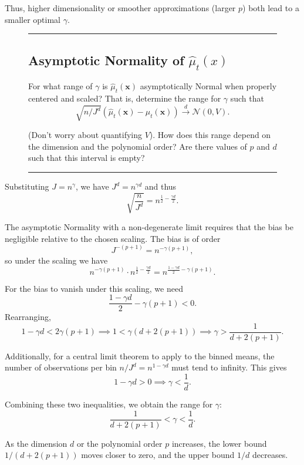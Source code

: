 \documentclass{article}
\newenvironment{colorparagraph}[1]{\par\color{#1}}{\par}
\begin{document}
Thus, higher dimensionality or smoother approximations (larger \( p \)) both lead to a smaller optimal \(\gamma\).
  
\begin{figure}[H]
  \begin{colorparagraph}{questioncolor}
  \rule{\textwidth}{0.5pt}
  \label{q1e}
  \subsection{Asymptotic Normality of \(\hat{\mu}_t(x)\)}
  
  For what range of \( \gamma \) is \( \hat{\mu}_t(\mathbf{x}) \) asymptotically Normal when properly centered and scaled? That is, determine the range for \( \gamma \) such that
  \[
  \sqrt{n / J^d} (\hat{\mu}_t(\mathbf{x}) - \mu_t(\mathbf{x})) \overset{d}{\to} \mathcal{N}(0, V).
  \]
  
  
  (Don't worry about quantifying $V$). How does this range depend on the dimension and the polynomial order? Are there values of $p$ and $d$ such that this interval is empty?
  
  \rule{\textwidth}{0.5pt}
\end{colorparagraph}
\end{figure}

Substituting \( J = n^\gamma \), we have \( J^d = n^{\gamma d} \) and thus
\[
\sqrt{\frac{n}{J^d}} = n^{\frac{1}{2}-\frac{\gamma d}{2}}.
\]

The asymptotic Normality with a non-degenerate limit requires that the bias be negligible relative to the chosen scaling. The bias is of order
\[
J^{-(p+1)} = n^{-\gamma(p+1)},
\]
so under the scaling we have
\[
n^{-\gamma(p+1)} \cdot n^{\frac{1}{2}-\frac{\gamma d}{2}} = n^{\frac{1-\gamma d}{2} - \gamma(p+1)}.
\]

For the bias to vanish under this scaling, we need
\[
\frac{1-\gamma d}{2} - \gamma(p+1) < 0.
\]
Rearranging,
\[
1 - \gamma d < 2\gamma (p+1) \implies 1 < \gamma(d+2(p+1)) \implies \gamma > \frac{1}{d+2(p+1)}.
\]

Additionally, for a central limit theorem to apply to the binned means, the number of observations per bin \( n/J^d = n^{1-\gamma d} \) must tend to infinity. This gives
\[
1-\gamma d > 0 \implies \gamma < \frac{1}{d}.
\]

Combining these two inequalities, we obtain the range for \(\gamma\):
\[
\frac{1}{d+2(p+1)} < \gamma < \frac{1}{d}.
\]

As the dimension \( d \) or the polynomial order \( p \) increases, the lower bound \( 1/(d+2(p+1)) \) moves closer to zero, and the upper bound \( 1/d \) decreases.
\end{document}
